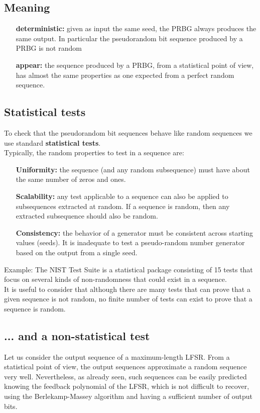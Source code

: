 \documentclass[a4paper, 10pt, titlepage]{article}
\begin{document}
\subsection*{Meaning}
\begin{itemize}[align=left]
\item[\textbf{deterministic:}] given as input the same seed, the PRBG always produces the same output. In particular the pseudorandom bit sequence produced by a PRBG is not random 
\item[\textbf{appear:}] the sequence produced by a PRBG, from a statistical point of view, has almost the same properties as one expected from a perfect random sequence.
\end{itemize}

\subsection*{Statistical tests}
To check that the pseudorandom bit sequences behave like random
sequences we use standard \textbf{statistical tests}. \\
Typically, the random properties to test in a sequence are:
\begin{itemize}[align=left]
\item[\textbf{Uniformity:}] the sequence (and any random subsequence) must have about the same number of zeros and ones.
\item[\textbf{Scalability:}] any test applicable to a sequence can also be applied to subsequences extracted at random. If a sequence is random, then any extracted subsequence should also be random.
\item[\textbf{Consistency:}] the behavior of a generator must be consistent across starting values (seeds). It is inadequate to test a pseudo-random number generator based on the output from a single seed.
\end{itemize}
Example: The NIST Test Suite is a statistical package consisting of 15 tests that focus on several kinds of non-randomness that could exist in a sequence. \medskip \\
It is useful to consider that although there are many tests that can prove that a given sequence is not random, no finite number of tests can exist to prove that a sequence is random.

\subsection*{... and a non-statistical test}
Let us consider the output sequence of a maximum-length LFSR. From a statistical point of view, the output sequences approximate a random
sequence very well. Nevertheless, as already seen, such sequences can be easily predicted knowing the feedback polynomial of the LFSR, which is not difficult to recover, using the Berlekamp-Massey algorithm and having a sufficient number of output bits.
\end{document}
